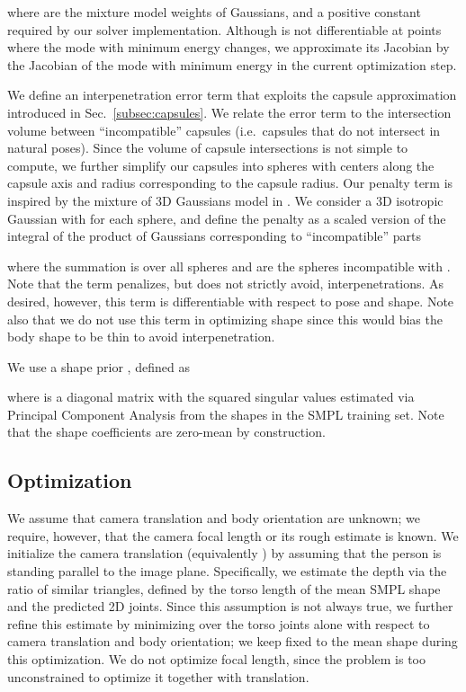 \documentclass[runningheads]{llncs}
\begin{document}
where  are the mixture model weights of  Gaussians, and  a positive constant
required by our solver implementation. 
Although  is not
differentiable at points where the mode with minimum energy changes,
we approximate its Jacobian by the Jacobian of the mode with minimum
energy in the current optimization step.
 
We define an interpenetration error term that exploits the capsule approximation
introduced in Sec.~\ref{subsec:capsules}. We relate the error term to the intersection volume between ``incompatible'' capsules (i.e.~capsules that do not intersect in natural poses).
Since the volume of capsule intersections is not simple to compute, we further simplify our capsules into spheres with centers 
along the capsule axis and radius  corresponding to the capsule radius.
Our penalty term is inspired by the mixture of 3D Gaussians model in \cite{Sridhar:CVPR:2015}.
We consider a 3D isotropic Gaussian with  for each sphere, and define the penalty as a scaled version of the
integral of the product of Gaussians corresponding to ``incompatible'' parts

where the summation is over all spheres  and  are the spheres incompatible with .
Note that the term penalizes, but does not strictly avoid, interpenetrations. As desired, however, this term is differentiable with respect to pose and shape.
Note also that we do not use this term in optimizing shape since this would bias the body shape to be thin to avoid interpenetration.

We use a shape prior , defined as

where  is a diagonal matrix with the squared
  singular values estimated via Principal Component Analysis from the
  shapes in the SMPL training set. Note that the shape coefficients
   are zero-mean by construction.
\subsection{Optimization}
\label{subsec:optimization}

We assume that camera translation and body orientation are unknown; we
require, however, that the camera focal length or its rough estimate
is known. We initialize the camera translation 
(equivalently ) by assuming that the
person is standing parallel to the image plane. Specifically, we
estimate the depth via the ratio of similar triangles, defined by the
torso length of the mean SMPL shape and the predicted 2D joints. 
Since this
assumption is not always true, we further refine this estimate by minimizing  over the torso joints
alone with respect to camera translation and body orientation; we keep
 fixed to the mean shape during this optimization.
We do not optimize focal length, since the problem is too unconstrained to optimize it together with translation.
\end{document}
